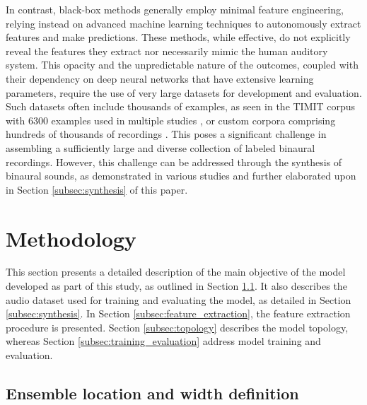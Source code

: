 \documentclass{article}
\begin{document}
In contrast, black-box methods generally employ minimal feature engineering, relying instead on advanced machine learning techniques to autonomously extract features and make predictions. These methods, while effective, do not explicitly reveal the features they extract nor necessarily mimic the human auditory system. This opacity and the unpredictable nature of the outcomes, coupled with their dependency on deep neural networks that have extensive learning parameters, require the use of very large datasets for development and evaluation. Such datasets often include thousands of examples, as seen in the TIMIT corpus with 6300 examples \parencite{garofolo_darpa_1993} used in multiple studies \parencite{yang_deepear_2022, benaroya_binaural_2018, wang_binaural_2020, vera-diaz_towards_2018, ma_exploiting_2017, pang_multitask_2019, ma_robust_2018, may_robust_2015}, or custom corpora comprising hundreds of thousands of recordings \parencite{antoniuk_blind_2023, zielinski_automatic_2022, zielinski_spatial_2022, zielinski_comparison_2020}. This poses a significant challenge in assembling a sufficiently large and diverse collection of labeled binaural recordings. However, this challenge can be addressed through the synthesis of binaural sounds, as demonstrated in various studies \parencite{antoniuk_blind_2023, zielinski_automatic_2022, zielinski_spatial_2022, zielinski_comparison_2020,yang_deepear_2022, ma_robust_2018} and further elaborated upon in Section \ref{subsec:synthesis} of this paper.

\section{Methodology}
\label{sec:methodology}

This section presents a detailed description of the main objective of the model developed as part of this study, as outlined in Section \ref{subsec:ensemble_definition}. It also describes the audio dataset used for training and evaluating the model, as detailed in Section \ref{subsec:synthesis}. In Section \ref{subsec:feature_extraction}, the feature extraction procedure is presented. Section \ref{subsec:topology} describes the model topology, whereas Section \ref{subsec:training_evaluation} address model training and evaluation.

\subsection{Ensemble location and width definition}
\label{subsec:ensemble_definition}
\end{document}

